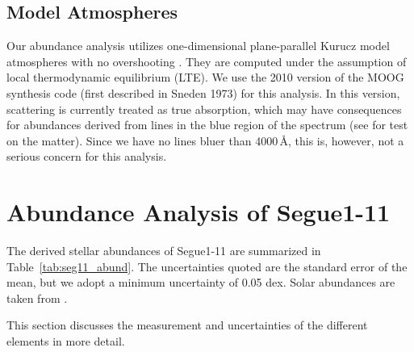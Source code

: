 \documentclass{emulateapj}
\begin{document}
\subsection{Model Atmospheres}
Our abundance analysis utilizes one-dimensional plane-parallel Kurucz
model atmospheres with no overshooting \citep{kurucz}. They are computed
under the assumption of local thermodynamic equilibrium (LTE). We use the
2010 version of the MOOG synthesis code (first described in Sneden 1973)\nocite{moog}
for this analysis.  In this version, scattering is currently treated as
true absorption, which may have consequences for abundances derived from
lines in the blue region of the spectrum (see \citet{Frebel2010a} for test on
the matter). Since we have no lines bluer than 4000\,{\AA}, this is, however,
not a serious concern for this analysis.




\section{Abundance Analysis of Segue1-11}
\label{sec:abund}

The derived stellar abundances of Segue1-11 are summarized in Table~\ref{tab:seg11_abund}. The uncertainties quoted are the standard error of the mean, but we adopt a minimum uncertainty of 0.05 dex. Solar abundances are taken from \citet{Asplund2009}.

 This section discusses the measurement and uncertainties of the different elements in more detail.
\end{document}
